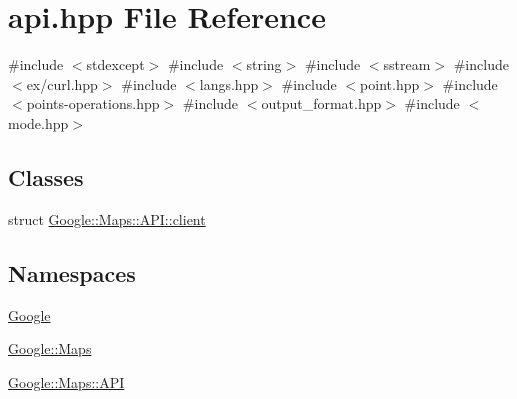 \hypertarget{a00005}{}\section{api.\+hpp File Reference}
\label{a00005}
{\ttfamily \#include $<$stdexcept$>$}\newline
{\ttfamily \#include $<$string$>$}\newline
{\ttfamily \#include $<$sstream$>$}\newline
{\ttfamily \#include $<$ex/curl.\+hpp$>$}\newline
{\ttfamily \#include $<$langs.\+hpp$>$}\newline
{\ttfamily \#include $<$point.\+hpp$>$}\newline
{\ttfamily \#include $<$points-\/operations.\+hpp$>$}\newline
{\ttfamily \#include $<$output\+\_\+format.\+hpp$>$}\newline
{\ttfamily \#include $<$mode.\+hpp$>$}\newline
\subsection*{Classes}
\begin{DoxyCompactItemize}
\item 
struct \hyperlink{a00047}{Google\+::\+Maps\+::\+A\+P\+I\+::client}
\end{DoxyCompactItemize}
\subsection*{Namespaces}
\begin{DoxyCompactItemize}
\item 
 \hyperlink{a00038}{Google}
\item 
 \hyperlink{a00039}{Google\+::\+Maps}
\item 
 \hyperlink{a00040}{Google\+::\+Maps\+::\+A\+PI}
\end{DoxyCompactItemize}
